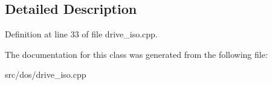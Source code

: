 \subsection{Detailed Description}


Definition at line 33 of file drive\-\_\-iso.\-cpp.



The documentation for this class was generated from the following file\-:\begin{DoxyCompactItemize}
\item 
src/dos/drive\-\_\-iso.\-cpp\end{DoxyCompactItemize}
